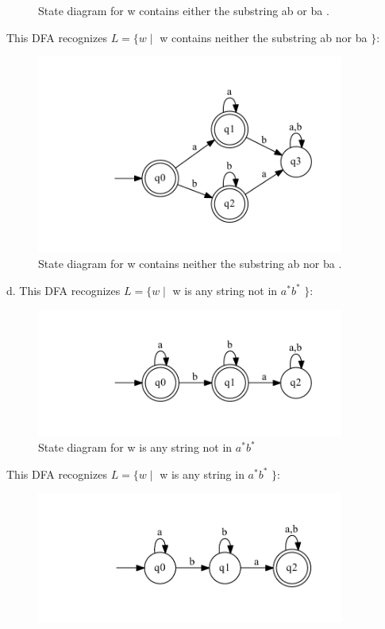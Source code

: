 \documentclass[10pt] {article}
\begin{document}
\begin{enumerate}
\begin{figure}[H]
\caption{State diagram for w contains either the substring ab or ba .}
\label{12}
\end{figure}
This DFA recognizes $L = \{ w \mid$ w contains neither the substring ab nor ba $\}$:
\begin{figure}[H]
\includegraphics[width=0.9\textwidth]{cb15.pdf}
\caption{State diagram for w contains neither the substring ab nor ba .}
\label{13}
\end{figure}
d. This DFA recognizes $L = \{ w \mid$ w is any string not in $a^* b^*$ $\}$:
\begin{figure}[H]
\includegraphics[width=0.9\textwidth]{da15.pdf}
\caption{State diagram for  w is any string not in $a^* b^*$ }
\label{14}
\end{figure}
This DFA recognizes $L = \{ w \mid$ w is any string in $a^* b^*$ $\}$:
\begin{figure}[H]
\includegraphics[width=0.9\textwidth]{db15.pdf}

\end{figure}
\end{enumerate}
\end{document}
